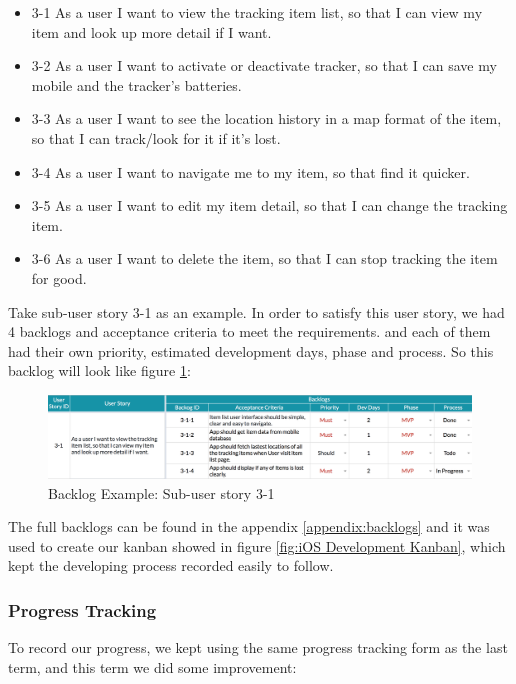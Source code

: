 \documentclass[12pt,a4paper]{article}
\begin{document}
          \begin{itemize}
            \item 3-1    As a user I want to view the tracking item list, so that I can view my item and look up more detail if I want.
            \item 3-2    As a user I want to activate or deactivate tracker, so that I can save my mobile and the tracker's batteries.
            \item 3-3 As a user I want to see the location history in a map format of the item, so that I can track/look for it if it's lost.
            \item 3-4    As a user I want to navigate me to my item, so that find it quicker.
            \item 3-5    As a user I want to edit my item detail, so that I can change the tracking item.
            \item 3-6    As a user I want to delete the item, so that I can stop tracking the item for good.
          \end{itemize}    
          
          Take sub-user story 3-1 as an example. In order to satisfy this user story, we had 4 backlogs and acceptance criteria to meet the requirements. and each of them had their own priority, estimated development days, phase and process. So this backlog will look like figure \ref{fig:Backlog Example: Sub-user story 3-1}:
          
          \begin{figure}[H]
            \centering
            \includegraphics[width=1\textwidth]{../assets/development-records-backlog-example.png}
            \caption{Backlog Example: Sub-user story 3-1}
            \label{fig:Backlog Example: Sub-user story 3-1}
          \end{figure}
          
          The full backlogs can be found in the appendix \ref{appendix:backlogs} and it was used to create our kanban showed in figure \ref{fig:iOS Development Kanban}, which kept the developing process recorded easily to follow.        
          
        \subsubsection{Progress Tracking}
          To record our progress, we kept using the same progress tracking form as the last term, and this term we did some improvement:
\end{document}
